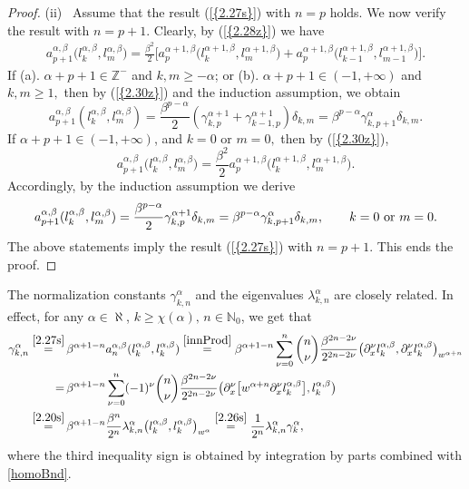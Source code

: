 \documentclass[10pt,reqno]{amsart}
\theoremstyle{remark}
\theoremstyle{definition}
\begin{document}
\begin{proof}
(ii)~ Assume that the result {{\rm (\ref{{2.27s}})}} with $n=p$ holds. We now verify the result with $n=p+1.$ Clearly, by {{\rm (\ref{{2.28z}})}} we have
    \begin{align}\label{2.30z}a^{\alpha,\beta}_{p+1}\big(l^{{\alpha},{\beta}}_k,l^{{\alpha},{\beta}}_m\big)= \frac{\beta^2}{2} \big[ a^{\alpha+1,\beta}_{p}\big(l^{\alpha+1,{\beta}}_k,l^{\alpha+1,{\beta}}_m\big) + a^{\alpha+1,\beta}_{p}\big(l^{\alpha+1,{\beta}}_{k-1},l^{\alpha+1,{\beta}}_{m-1}\big)  \big].\end{align}
If (a). $\alpha+p+1\in \mathbb{Z}^-$ and $k,m\geq -\alpha$; or (b). $\alpha+p+1\in (-1,+\infty)$ and $k,m\geq 1,$ then by {{\rm (\ref{{2.30z}})}} and the induction assumption, we obtain
$$a^{\alpha,\beta}_{p+1}(l^{{\alpha},{\beta}}_k,l^{{\alpha},{\beta}}_m)=\frac{\beta^{p-\alpha}}{2} (\gamma^{\alpha+1}_{k,p}+\gamma^{\alpha+1}_{k-1,p})\delta_{k,m} =\beta^{p-\alpha} \gamma^{\alpha}_{k,p+1}\delta_{k,m}.$$
If $\alpha+p+1\in (-1,+\infty)$, and $k=0$ or $m=0,$ then by {{\rm (\ref{{2.30z}})}},
$$a^{\alpha,\beta}_{p+1}\big(l^{{\alpha},{\beta}}_k,l^{{\alpha},{\beta}}_m\big)= \frac{\beta^2}{2} a^{\alpha+1,\beta}_{p}\big(l^{\alpha+1,{\beta}}_k,l^{\alpha+1,{\beta}}_m\big).$$
Accordingly, by  the induction assumption we derive
$$a^{\alpha,\beta}_{p+1}(l^{{\alpha},{\beta}}_k,l^{{\alpha},{\beta}}_m)
=\frac{\beta^{p-\alpha}}{2} \gamma^{\alpha+1}_{k,p}\delta_{k,m} =\beta^{p-\alpha} \gamma^{\alpha}_{k,p+1}\delta_{k,m},\qquad k=0 ~{\rm or}~ m=0.$$
The above statements imply the result {{\rm (\ref{{2.27s}})}} with $n=p+1.$ This ends the proof.
\fi
\end{proof}

The normalization constants $\gamma^{\alpha}_{k,n}$ and the eigenvalues  $\lambda^{\alpha}_{k,n}$ are closely related. In effect, for any $\alpha\in \aleph$, $  k\ge \chi(\alpha),\, n\in \mathbb{N}_0$,
we get  that
\begin{align}
\label{2.29s}
\begin{split}
\gamma^{\alpha}_{k,n} \overset{\eqref{2.27s}}=&\, \beta^{\alpha+1-n}  a^{\alpha,\beta}_n(l^{\alpha,\beta}_k, l^{\alpha,\beta}_k)
\overset{\eqref{innProd}} =  \beta^{\alpha+1-n} \sum_{\nu=0}^{n} \binom{n}{\nu} \frac{\beta^{2n-2\nu}}{2^{2n-2\nu}}
\big(\partial_x^{\nu}l^{\alpha,\beta}_k, \partial_x^{\nu}l^{\alpha,\beta}_k\big)_{w^{\alpha+n}}
\\
=&\,\beta^{\alpha+1-n}   \sum_{\nu=0}^{n} (-1)^{\nu}\binom{n}{\nu} \frac{\beta^{2n-2\nu}}{2^{2n-2\nu}}
\big(  \partial_x^{\nu}\big[ w^{\alpha+n} \partial_x^{\nu}l^{\alpha,\beta}_k\big], l^{\alpha,\beta}_k\big)
\\
\overset{\eqref{2.20s}}=&\,\beta^{\alpha+1-n}  \frac{\beta^n}{2^n}  \lambda^{\alpha}_{k,n}
\big( l^{\alpha,\beta}_k,  l^{\alpha,\beta}_k\big)_{w^{\alpha}}
  \overset{\eqref{2.26s}}=\frac{1}{2^n}  \lambda^{\alpha}_{k,n} \gamma^{\alpha}_k,
 \end{split}
\end{align}
where the third inequality sign is obtained by integration by parts combined with \eqref{homoBnd}.
\end{document}
